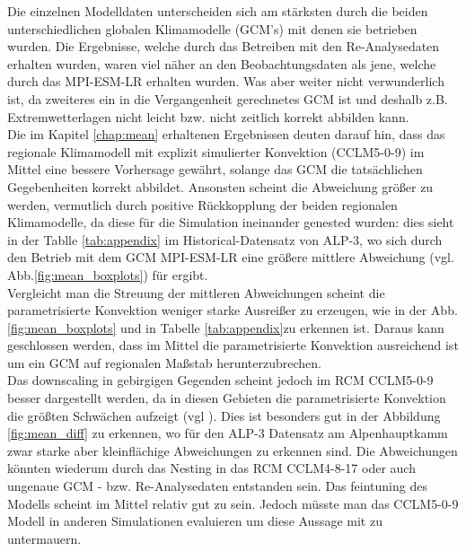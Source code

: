 Die einzelnen Modelldaten unterscheiden sich am stärksten durch die beiden unterschiedlichen globalen Klimamodelle (GCM's) mit denen sie betrieben wurden. Die Ergebnisse, welche durch das Betreiben mit den Re-Analysedaten erhalten wurden, waren viel näher an den Beobachtungsdaten als jene, welche durch das MPI-ESM-LR erhalten wurden. Was aber weiter nicht verwunderlich ist, da zweiteres ein in die Vergangenheit gerechnetes GCM ist und deshalb z.B. Extremwetterlagen nicht leicht bzw. nicht zeitlich korrekt abbilden kann.\vspace{1pt}\\

Die im Kapitel \ref{chap:mean} erhaltenen Ergebnissen deuten darauf hin, dass das regionale Klimamodell mit explizit simulierter Konvektion (CCLM5-0-9) im Mittel eine bessere Vorhersage gewährt, solange das GCM die tatsächlichen Gegebenheiten korrekt abbildet. Ansonsten scheint die Abweichung größer zu werden, vermutlich durch positive Rückkopplung der beiden regionalen Klimamodelle, da diese für die Simulation ineinander genested wurden: dies sieht in der Tablle \ref{tab:appendix} im Historical-Datensatz von ALP-3, wo sich durch den Betrieb mit dem GCM MPI-ESM-LR eine größere mittlere Abweichung (vgl. Abb.\ref{fig:mean_boxplots}) für ergibt.\\
Vergleicht man die Streuung der mittleren Abweichungen scheint die parametrisierte Konvektion weniger starke Ausreißer zu erzeugen, wie in der Abb.\ref{fig:mean_boxplots} und in Tabelle \ref{tab:appendix}zu erkennen ist. Daraus kann geschlossen werden, dass im Mittel die parametrisierte Konvektion ausreichend ist um ein GCM auf regionalen Maßstab herunterzubrechen.\\
Das downscaling in gebirgigen Gegenden scheint jedoch im RCM CCLM5-0-9 besser dargestellt werden, da in diesen Gebieten die parametrisierte Konvektion die größten Schwächen aufzeigt (vgl \cite{RCM}). Dies ist besonders gut in der Abbildung \ref{fig:mean_diff} zu erkennen, wo für den ALP-3 Datensatz am Alpenhauptkamm zwar starke aber kleinflächige Abweichungen zu erkennen sind. Die Abweichungen könnten wiederum durch das Nesting in das RCM CCLM4-8-17 oder auch ungenaue GCM - bzw. Re-Analysedaten entstanden sein. Das feintuning des Modells scheint im Mittel relativ gut zu sein. Jedoch müsste man das CCLM5-0-9 Modell in anderen Simulationen evaluieren um diese Aussage mit zu untermauern. \vspace{1pt}\\


